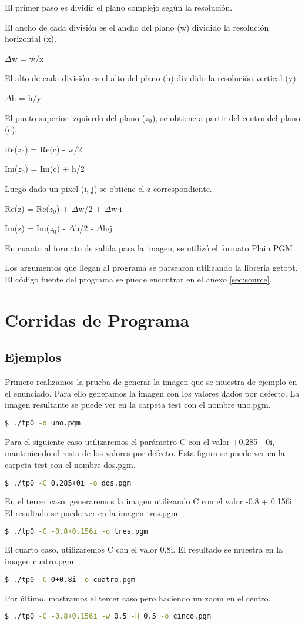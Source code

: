 \documentclass{article}
\begin{document}
El primer paso es dividir el plano complejo según la resolución. 

El ancho de cada división es el ancho del plano (w) dividido la resolución horizontal (x).

$\Delta$w = w/x

El alto de cada división es el alto del plano (h) dividido la resolución vertical (y).

$\Delta$h = h/y

El punto superior izquierdo del plano ($z_{0}$), se obtiene a partir del centro del plano (c).

Re($z_{0}$) = Re(c) - w/2

Im($z_{0}$) = Im(c) + h/2

Luego dado un pixel (i, j) se obtiene el z correspondiente.

Re(z) = Re($z_{0}$) + $\Delta$w/2 + $\Delta$w$\cdot$i

Im(z) = Im($z_{0}$) - $\Delta$h/2 - $\Delta$h$\cdot$j

En cuanto al formato de salida para la imagen, se utilizó el formato Plain PGM.

Los argumentos que llegan al programa se parsearon utilizando la librería getopt. 
El código fuente del programa se puede encontrar en el anexo \ref{sec:source}.

\section{Corridas de Programa}


\subsection{Ejemplos}

Primero realizamos la prueba de generar la imagen que se muestra de ejemplo en el enunciado. Para ello generamos la imagen con los valores dados por defecto. 
La imagen resultante se puede ver en la carpeta test con el nombre uno.pgm.
\begin{lstlisting}[language=bash]
$ ./tp0 -o uno.pgm
\end{lstlisting}
Para el siguiente caso utilizaremos el parámetro C con el valor +0,285 - 0i, manteniendo el resto de los valores por defecto. Esta figura se puede ver en la carpeta test con el nombre dos.pgm.
\begin{lstlisting}[language=bash]
$ ./tp0 -C 0.285+0i -o dos.pgm
\end{lstlisting}
En el tercer caso, generaremos la imagen utilizando C con el valor -0.8 + 0.156i. El resultado se puede ver en la imagen tres.pgm.
\begin{lstlisting}[language=bash]
$ ./tp0 -C -0.8+0.156i -o tres.pgm
\end{lstlisting}
El cuarto caso, utilizaremos C con el valor 0.8i. El resultado se muestra en la imagen cuatro.pgm.
\begin{lstlisting}[language=bash]
$ ./tp0 -C 0+0.8i -o cuatro.pgm
\end{lstlisting}
Por último, mostramos el tercer caso pero haciendo un zoom en el centro.
\begin{lstlisting}[language=bash]
$ ./tp0 -C -0.8+0.156i -w 0.5 -H 0.5 -o cinco.pgm
\end{lstlisting}
\end{document}
